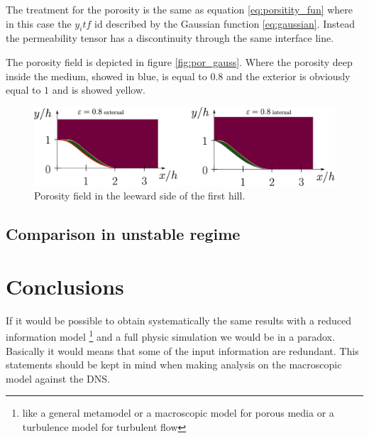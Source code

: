 The treatment for the porosity is the same as equation \eqref{eq:porsitity_fun} where in this case the $y_itf$ id described by the Gaussian function \eqref{eq:gaussian}.
Instead the permeability tensor has a discontinuity through the same interface line.

The porosity field is depicted in figure \ref{fig:por_gauss}. Where the porosity deep inside the medium, showed in blue, is equal to $0.8$ and the exterior is obviously equal to $1$ and is showed yellow.

\begin{figure}[h]
\centering
\includegraphics[width=0.5\linewidth]{chapter_5/figure/por}
\caption{Porosity field in the leeward side of the first hill.}
\label{fig:por}
\end{figure}





\subsection{Comparison in unstable regime}



\section{Conclusions}

If it would be possible to obtain systematically the same results with a reduced information model \footnote{like a general metamodel or a macroscopic model for porous media or a turbulence model for turbulent flow} and a full physic simulation we would be in a paradox. Basically it would means that some of the input information are redundant. This statements should be kept in mind when making analysis on the macroscopic model against the DNS.



